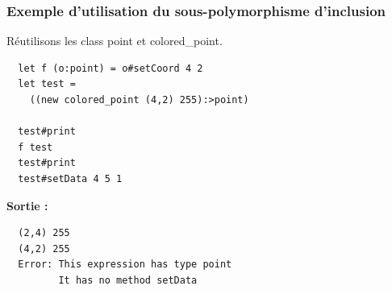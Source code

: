 \begin{frame}[fragile]
	\frametitle{Exemple d'utilisation du sous-polymorphisme d'inclusion}
	Réutilisons les class point et colored\_point.
	\begin{lstlisting}
  let f (o:point) = o#setCoord 4 2
  let test = 
    ((new colored_point (4,2) 255):>point)

  test#print
  f test
  test#print
  test#setData 4 5 1
	\end{lstlisting}
	\textbf{Sortie :}
	\begin{lstlisting}
  (2,4) 255
  (4,2) 255
  Error: This expression has type point
         It has no method setData
	\end{lstlisting}
\end{frame}
